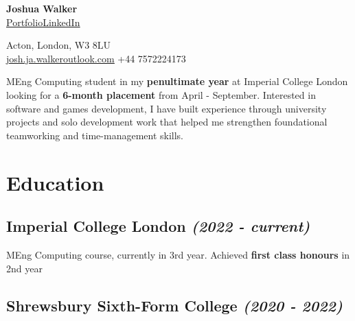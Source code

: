 \documentclass{article}
\makeatletter
\newcommand{\contact}[1]{\normalsize{#1}}
\newcommand{\contactdiv}{\hspace*{0.8em}}
\newcommand{\email}[2]{\href{mailto:#1@#2}{\underline{#1{\small\fontfamily{phv}\selectfont@}#2}}}
\newcommand{\linkedin}{\href{https://www.linkedin.com/in/joshua-walker-080714238/}{\underline{LinkedIn}}}
\newcommand{\portfolio}{\href{https://josh-ja-walker.github.io/portfolio/}{\underline{Portfolio}}}
\newcommand{\dates}[1]{\hfill\textit{(#1)}}
\newcommand{\tab}{\hspace{1.5em}}
\makeatother
\begin{document}
\begin{multicols}{2}

    \begin{flushleft}
        {\LARGE\textbf{Joshua Walker}}\\
        \vspace{0.5em}
        \portfolio\contactdiv\linkedin
    \end{flushleft}
    
    \columnbreak
    
    \begin{flushright}
        \contact{Acton, London, W3 8LU}\\
        \vspace{0.5em}
        \contact{\email{josh.ja.walker}{outlook.com}}
        \contactdiv
        \contact{+44 7572224173}
    \end{flushright}
    
\end{multicols}

\vspace{0.8em}

{\noindent}MEng Computing student in my \textbf{penultimate year} at Imperial College London looking for a \textbf{6-month placement} from April - September. 
Interested in software and games development, I have built experience through university projects and solo development work 
that helped me strengthen foundational teamworking and time-management skills. 

\vspace{0.15em}


\section*{Education}

\subsection*{\textbf{Imperial College London} \dates{2022 - current}}

{\tab}MEng Computing course, currently in 3rd year. Achieved \textbf{first class honours} in 2nd year


\subsection*{\textbf{Shrewsbury Sixth-Form College} \dates{2020 - 2022}}
\end{document}
